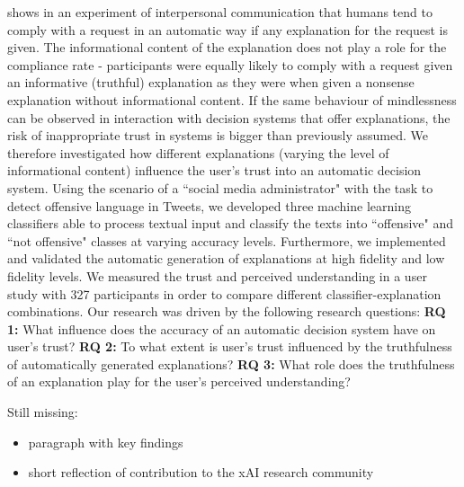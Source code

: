 \cite{langer1978mindlessness} shows in an experiment of interpersonal communication that humans tend to comply with a request in an automatic way if any explanation for the request is given. The informational content of the explanation does not play a role for the compliance rate - participants were equally likely to comply with a request given an informative (truthful) explanation as they were when given a nonsense explanation without informational content. If the same behaviour of mindlessness can be observed in interaction with decision systems that offer explanations, the risk of inappropriate trust in systems is bigger than previously assumed.\medskip \newline
We therefore investigated how different explanations (varying the level of informational content) influence the user's trust into an automatic decision system. Using the scenario of a ``social media administrator" with the task to detect offensive language in Tweets, we developed three machine learning classifiers able to process textual input and classify the texts into ``offensive" and ``not offensive" classes at varying accuracy levels. Furthermore, we implemented and validated the automatic generation of explanations at high fidelity and low fidelity levels. We measured the trust and perceived understanding in a user study with 327 participants in order to compare different classifier-explanation combinations. Our research was driven by the following research questions:\medskip \newline
\textbf{RQ 1:} What influence does the accuracy of an automatic decision system have on user's trust?\newline
\textbf{RQ 2:} To what extent is user's trust influenced by the truthfulness of automatically generated explanations?\newline
\textbf{RQ 3:} What role does the truthfulness of an explanation play for the user's perceived understanding?\medskip \newline




{\color{blue}
Still missing:
\begin{itemize}
	\item paragraph with key findings
	\item short reflection of contribution to the xAI research community 
\end{itemize}}

